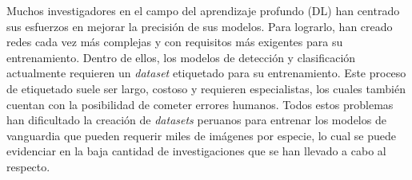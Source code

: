 Muchos investigadores en el campo del aprendizaje profundo (DL) 
han centrado sus esfuerzos en mejorar la precisión de sus modelos. Para 
lograrlo, han creado redes cada vez más complejas y con requisitos más 
exigentes para su entrenamiento. Dentro de ellos, los modelos de detección 
y clasificación actualmente requieren un \textit{dataset} etiquetado para su 
entrenamiento. Este proceso de etiquetado suele ser largo, costoso y requieren 
especialistas, los cuales también cuentan con la posibilidad de cometer 
errores humanos. Todos estos problemas han dificultado la creación de 
\textit{datasets} peruanos para entrenar los modelos de vanguardia que pueden 
requerir miles de imágenes por especie, lo cual se puede evidenciar en la 
baja cantidad de investigaciones que se han llevado a cabo al respecto. 